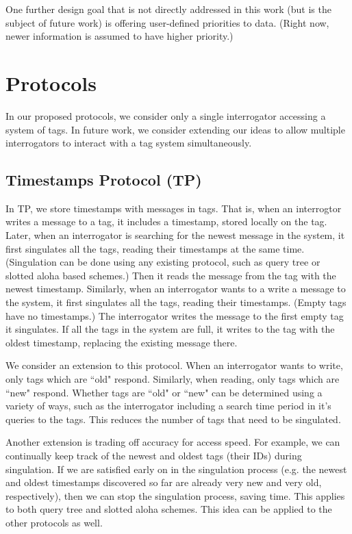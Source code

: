 \documentclass[conference]{IEEEtran}
\begin{document}
One further design goal that is not directly addressed in this work (but is the subject of future work) is offering user-defined priorities to data.  (Right now, newer information is assumed to have higher priority.)

\section{Protocols}
In our proposed protocols, we consider only a single interrogator accessing a system of tags.  In future work, we consider extending our ideas to allow multiple interrogators to interact with a tag system simultaneously.   

\subsection{Timestamps Protocol (TP)}
In TP, we store timestamps with messages in tags.  That is, when an interrogtor writes a message to a tag, it includes a timestamp, stored locally on the tag.  Later, when an interrogator is searching for the newest message in the system, it first singulates all the tags, reading their timestamps at the same time.  (Singulation can be done using any existing protocol, such as query tree \cite{conf:Law01} or slotted aloha \cite{conf:Vogt01} based schemes.)  Then it reads the message from the tag with the newest timestamp.  Similarly, when an interrogator wants to a write a message to the system, it first singulates all the tags, reading their timestamps.  (Empty tags have no timestamps.)  The interrogator writes the message to the first empty tag it singulates.  If all the tags in the system are full, it writes to the tag with the oldest timestamp, replacing the existing message there.

We consider an extension to this protocol.  When an interrogator wants to write, only tags which are ``old" respond.  Similarly, when reading, only tags which are ``new" respond.  Whether tags are ``old" or ``new" can be determined using a variety of ways, such as the interrogator including a search time period in it's queries to the tags.  This reduces the number of tags that need to be singulated.

Another extension is trading off accuracy for access speed.  For example, we can continually keep track of the newest and oldest tags (their IDs) during singulation.  If we are satisfied early on in the singulation process (e.g. the newest and oldest timestamps discovered so far are already very new and very old, respectively), then we can stop the singulation process, saving time.  This applies to both query tree and slotted aloha schemes.  This idea can be applied to the other protocols as well.
\end{document}
